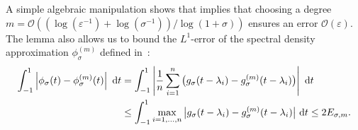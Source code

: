 A simple algebraic manipulation shows that  implies that choosing a degree $m = \mathcal{O}((\log(\varepsilon^{-1}) + \log(\sigma^{-1})) / \log(1 + \sigma))$ ensures an error $\mathcal{O}(\varepsilon)$. The lemma also allows us to bound the $L^1$-error of the spectral density approximation
$\phi_{\sigma}^{(m)}$ defined in~:
\begin{align}
    \int_{-1}^{1} \left| \phi_{\sigma}(t) - \phi_{\sigma}^{(m)}(t) \right|~\mathrm{d}t 
    &= \int_{-1}^{1} \left| \frac{1}{n} \sum_{i=1}^n \big(g_{\sigma}(t - \lambda_i) - g_{\sigma}^{(m)}(t - \lambda_i)\big) \right|~\mathrm{d}t \notag \\
    &\leq \int_{-1}^{1} \max_{i = 1, \dots, n} \big| g_{\sigma}(t - \lambda_i) - g_{\sigma}^{(m)}(t - \lambda_i) \big|~\mathrm{d}t    \leq 2 E_{\sigma, m}.
    \label{equ:chebyshev-interpolation-spectral-density}
\end{align}

